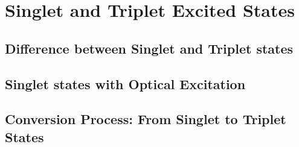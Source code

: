 \section{Singlet and Triplet Excited States}
\label{sec:excitedStates}

\subsection{Difference between Singlet and Triplet states}
\label{sub:diff}

\subsection{Singlet states with Optical Excitation}
\label{sub:opticalExcitation}

\subsection{Conversion Process: From Singlet to Triplet States}
\label{sub:conversion}